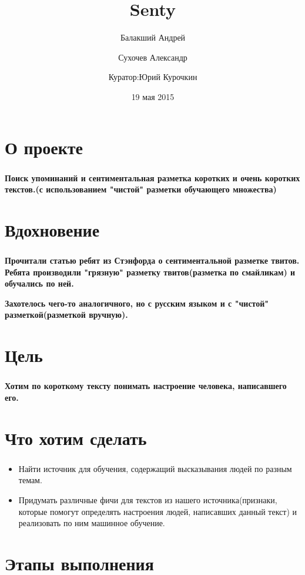 \documentclass[t]{beamer}
\title{Senty}
\author{Балакший Андрей \and Сухочев Александр 
	\and \newline Куратор:Юрий Курочкин}
\date{19 мая 2015}
\institute[Computer Science Center]
\begin{document}
	\frame[plain]{\titlepage}
	
	
	\section{О проекте}
	\begin{frame}
		\frametitle{\insertsection}
		\textbf{Поиск упоминаний и сентиментальная разметка коротких и 	очень коротких текстов.(с использованием "чистой" разметки обучающего множества)}
	\end{frame}
	
	
	\section{Вдохновение}
	\begin{frame}
		\frametitle{\insertsection}
		\textbf{Прочитали статью ребят из Стэнфорда о сентиментальной разметке твитов. Ребята производили "грязную" разметку твитов(разметка по смайликам) и обучались по ней.}\pause
		
		\textbf{Захотелось чего-то аналогичного, но с русским языком и с "чистой" разметкой(разметкой вручную).}
	\end{frame}
	
	
	\section{Цель}
	\begin{frame}
		\frametitle{\insertsection}
		\textbf{Хотим по короткому тексту понимать настроение человека, написавшего его.}
	\end{frame}
	
	
	\section{Что хотим сделать}
	\begin{frame}
		\frametitle{\insertsection}
		\begin{itemize}
			\item Найти источник для обучения, содержащий высказывания людей по разным темам.	
			\item Придумать различные фичи для текстов из нашего источника(признаки, которые помогут определять настроения людей, написавших данный текст) и реализовать по ним машинное обучение.
		\end{itemize}
	\end{frame}
	
	
	\section{Этапы выполнения}
\end{document}
